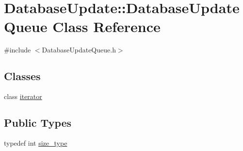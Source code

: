 \hypertarget{class_database_update_1_1_database_update_queue}{}\section{Database\+Update\+:\+:Database\+Update\+Queue Class Reference}
\label{class_database_update_1_1_database_update_queue}


{\ttfamily \#include $<$Database\+Update\+Queue.\+h$>$}

\subsection*{Classes}
\begin{DoxyCompactItemize}
\item 
class \hyperlink{class_database_update_1_1_database_update_queue_1_1iterator}{iterator}
\end{DoxyCompactItemize}
\subsection*{Public Types}
\begin{DoxyCompactItemize}
\item 
typedef int \hyperlink{class_database_update_1_1_database_update_queue_a76ce338ce8121f40a293ed5b7024240b}{size\+\_\+type}
\end{DoxyCompactItemize}
